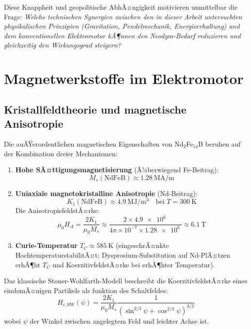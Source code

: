 ﻿\documentclass[12pt, a4paper]{report}
\theoremstyle{definition}
\theoremstyle{remark}
\begin{document}
Diese Knappheit und geopolitische AbhÃ¤ngigkeit motivieren unmittelbar die Frage:
\emph{Welche technischen Synergien zwischen den in dieser Arbeit untersuchten
physikalischen Prinzipien (Gravitation, Pendelmechanik, Energieerhaltung) und
dem konventionellen Elektromotor kÃ¶nnen den Neodym-Bedarf reduzieren und
gleichzeitig den Wirkungsgrad steigern?}

\section{Magnetwerkstoffe im Elektromotor}
\label{ssec:magnetwerkstoffe}

\subsection{Kristallfeldtheorie und magnetische Anisotropie}

Die auÃŸerordentlichen magnetischen Eigenschaften von Nd$_2$Fe$_{14}$B beruhen auf
der Kombination dreier Mechanismen:

\begin{enumerate}[leftmargin=2em, label=(\arabic*)]
  \item \textbf{Hohe SÃ¤ttigungsmagnetisierung} (Ã¼berwiegend Fe-Beitrag):
    \begin{equation}
      M_s(\text{NdFeB}) \approx \SI{1.28}{\mega\ampere\per\metre}
      \label{eq:Ms_ndfe}
    \end{equation}
  \item \textbf{Uniaxiale magnetokristalline Anisotropie} (Nd-Beitrag):
    \begin{equation}
      K_1(\text{NdFeB}) \approx \SI{4.9}{\mega\joule\per\cubic\metre}
      \quad \text{bei } T = \SI{300}{\kelvin}
      \label{eq:K1_ndfe}
    \end{equation}
    Die AnisotropiefeldstÃ¤rke:
    \begin{equation}
      \mu_0 H_A = \frac{2K_1}{\mu_0 M_s}
      \approx \frac{2 \times \SI{4.9e6}{}}{4\pi \times 10^{-7} \times \SI{1.28e6}{}}
      \approx \SI{6.1}{\tesla}
      \label{eq:HA}
    \end{equation}
  \item \textbf{Curie-Temperatur} $T_C \approx \SI{585}{\kelvin}$ (eingeschrÃ¤nkte
    HochtemperaturstabilitÃ¤t; Dyspro\-sium-Substitution auf Nd-PlÃ¤tzen erhÃ¶ht
    $T_C$ und KoerzitivfeldstÃ¤rke bei erhÃ¶hter Temperatur).
\end{enumerate}

Das klassische Stoner-Wohlfarth-Modell beschreibt die KoerzitivfeldstÃ¤rke eines
eindomÃ¤nigen Partikels als funktion des Schaltfeldes:
\begin{equation}
  H_{c,\text{SW}}(\psi) = \frac{2K_1}{\mu_0 M_s}
    \frac{1}{(\sin^{2/3}\psi + \cos^{2/3}\psi)^{3/2}}
  \label{eq:stoner_wohlfarth}
\end{equation}
wobei $\psi$ der Winkel zwischen angelegtem Feld und leichter Achse ist.
\end{document}
